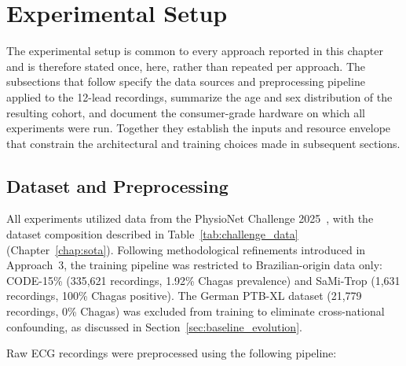 \section{Experimental Setup}

The experimental setup is common to every approach reported in this chapter and is therefore stated once, here, rather than repeated per approach. The subsections that follow specify the data sources and preprocessing pipeline applied to the 12-lead recordings, summarize the age and sex distribution of the resulting cohort, and document the consumer-grade hardware on which all experiments were run. Together they establish the inputs and resource envelope that constrain the architectural and training choices made in subsequent sections.

\subsection{Dataset and Preprocessing}
\label{sec:dataset}

All experiments utilized data from the PhysioNet Challenge 2025~\cite{reyna2024detection}, with the dataset composition described in Table~\ref{tab:challenge_data} (Chapter~\ref{chap:sota}). Following methodological refinements introduced in Approach~3, the training pipeline was restricted to Brazilian-origin data only: CODE-15\% (335,621 recordings, 1.92\% Chagas prevalence) and SaMi-Trop (1,631 recordings, 100\% Chagas positive). The German PTB-XL dataset (21,779 recordings, 0\% Chagas) was excluded from training to eliminate cross-national confounding, as discussed in Section~\ref{sec:baseline_evolution}.

Raw ECG recordings were preprocessed using the following pipeline:


